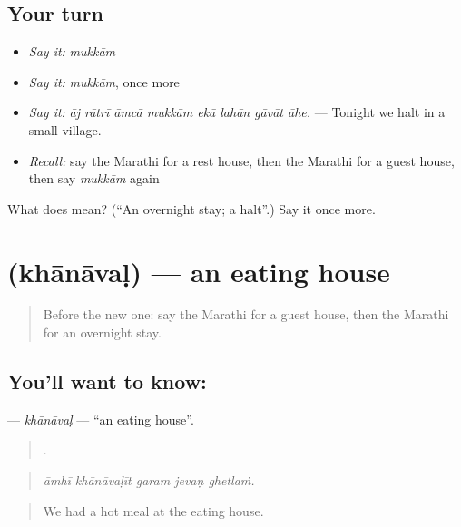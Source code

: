 \subsection*{Your turn}
\begin{itemize}
\raggedright
  \item \emph{Say it:} \emph{mukkām}
  \item \emph{Say it:} \emph{mukkām}, once more
  \item \emph{Say it:} \emph{āj rātrī āmcā mukkām ekā lahān gāvāt āhe.} — Tonight we halt in a small village.
  \item \emph{Recall:} say the Marathi for a rest house, then the Marathi for a guest house, then say \emph{mukkām} again
\end{itemize}

\begin{tcolorbox}[breakable,colback=teal!4,colframe=teal!35!black,title={Before you move on}]
What does  mean? (\textquotedblleft{}An overnight stay; a halt\textquotedblright{}.) Say it once more.
\end{tcolorbox}
\section[\texorpdfstring{\mr{खानावळ} (khānāvaḷ)}{खानावळ (khānāvaḷ)}]{ (khānāvaḷ) — an eating house}

\label{lesson:MR-C413-khanaval}



\begin{quote}
Before the new one: say the Marathi for a guest house, then the Marathi for an overnight stay.
\end{quote}

\subsection*{You'll want to know: }
\textbf{} — \emph{khānāvaḷ} — \textquotedblleft{}an eating house\textquotedblright{}.

\begin{quote}
    .
\end{quote}

\begin{quote}
\emph{āmhī khānāvaḷīt garam jevaṇ ghetlaṁ.}
\end{quote}

\begin{quote}
We had a hot meal at the eating house.
\end{quote}

